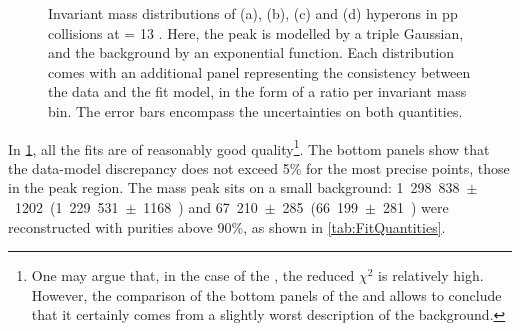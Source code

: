 \begin{figure}[p]
{	\label{fig:OmegaMinus_TripleGaussian}
} 
\caption{Invariant mass distributions of \rmXiM (a), \rmAxiP (b), \rmOmegaM (c) and \rmAomegaP (d) hyperons in pp collisions at \sqrtS = 13 \tev. Here, the peak is modelled by a triple Gaussian, and the background by an exponential function. Each distribution comes with an additional panel representing the consistency between the data and the fit model, in the form of a ratio per invariant mass bin. The error bars encompass the uncertainties on both quantities.}
	\label{fig:InvMassCascades}
\end{figure}

In \figs\ref{fig:InvMassCascades}, all the fits are of reasonably good quality\footnote{One may argue that, in the case of the \rmXiM, the reduced $\chi^{2}$  is relatively high. However, the comparison of the bottom panels of the \rmXiM and \rmAxiP allows to conclude that it certainly comes from a slightly worst description of the background.}. The bottom panels show that the data-model discrepancy does not exceed 5\% for the most precise points, \ie those in the peak region. The mass peak sits on a small background: 1~298~838~$\pm$~1202~\rmXiM (1~229~531~$\pm$~1168~\rmAxiP) and 67~210~$\pm$~285~\rmOmegaM (66~199~$\pm$~281~\rmAomegaP) were reconstructed with purities above 90\%, as shown in \tab\ref{tab:FitQuantities}.

